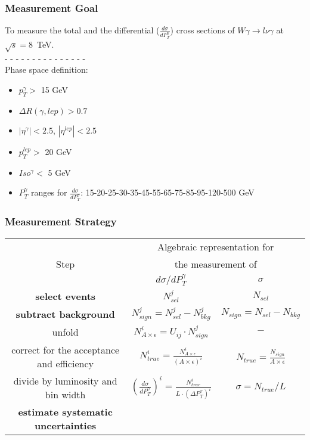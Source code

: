 \begin{frame}\frametitle{Measurement Goal}
  \scriptsize

  To measure the total and the differential ($\frac{d\sigma}{dP_T^{\gamma}}$) cross sections of $W\gamma\rightarrow l\nu\gamma$ at $\sqrt{s}=$8~TeV.\\
  - - - - - - - - - - - - - - - \\
  Phase space definition:
  \begin{itemize}
  \item $p_T^{\gamma}>$ 15 GeV
  \item $\Delta{R}(\gamma,lep) > 0.7$
  \item $|\eta^{\gamma}|<2.5$, $|\eta^{lep}|<2.5$
  \item $p_T^{lep}>$ 20 GeV
  \item $Iso^{\gamma}<$ 5 GeV
  \item $P_T^{\gamma}$ ranges for $\frac{d\sigma}{dP_T^{\gamma}}$: 15-20-25-30-35-45-55-65-75-85-95-120-500 GeV
  \end{itemize}
\end{frame}%

\begin{frame}\frametitle{Measurement Strategy}
\begin{table}[h]
  \scriptsize
  \begin{center}
  \begin{tabular}{|c|c|c|}
    \hline
          & \multicolumn{2}{|c|}{Algebraic representation for} \\ 
     Step & \multicolumn{2}{|c|}{the measurement of} \\ 
          & $d\sigma/dP_{T}^{\gamma}$ & $\sigma$ \\ \hline
    {\bfseries{select events}} & {\bfseries{$N_{sel}^j$}} &    {\bfseries{$N_{sel}$}}       \\ \hline
    {\bfseries{subtract background}} & {\bfseries{$N_{sign}^j = N_{sel}^j - N_{bkg}^j$}} &    {\bfseries{$N_{sign}=N_{sel}-N_{bkg}$}}       \\ \hline
    unfold   & $N_{A\times\epsilon}^i = U_{ij} \cdot N_{sign}^j$ &    $-$       \\ \hline
    correct for the acceptance and efficiency & $N_{true}^i = \frac{N_{A\times\epsilon}^i}{(A \times\epsilon)^i}$ &  $N_{true}=\frac{N_{sign}}{A\times\epsilon}$       \\ \hline
    divide by luminosity and bin width & $ \left( \frac{d\sigma}{dP_{T}^\gamma} \right) ^i = \frac{N_{true}^i}{L \cdot (\Delta P_T^\gamma)^i}$  &  $\sigma = N_{true}/L$       \\ \hline
     {\bfseries{estimate systematic uncertainties}} &  &         \\ \hline
  \end{tabular}
  \label{tab:analysisOutline}
  \end{center}
\end{table}
\end{frame}%
